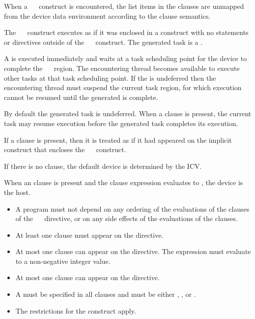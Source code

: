\descr
When a ~~ construct is encountered, the list items in the  clauses are unmapped from the device data environment according to the  clause semantics.

The ~~ construct executes as if it was enclosed in a  construct with no statements or directives outside of the ~~ construct. The generated task is a .

A  is executed immediately and waits at a task scheduling point for the device to complete the ~~ region. The encountering thread becomes available to execute other tasks at that task scheduling point. If the  is undeferred then the encountering thread must suspend the current task region, for which execution cannot be resumed until the generated  is complete.

By default the generated task is undeferred. When a  clause is present, the current task may resume execution before the generated task completes its execution.

If a  clause is present, then it is treated as if it had appeared on the implicit  construct that encloses the ~~ construct.

If there is no  clause, the default device is determined by the  ICV.

When an  clause is present and the  clause expression evaluates to , the device is the host. 
\restrictions
\begin{itemize}
\item A program must not depend on any ordering of the evaluations of the clauses of the ~~ directive, or on any side effects of the evaluations of the clauses.
\item At least one  clause must appear on the directive.
\item At most one  clause can appear on the directive. The  expression must evaluate to a non-negative integer value.
\item At most one  clause can appear on the directive.
\item A  must be specified in all  clauses and must be either , , or .
\item The restrictions for the  construct apply. 
\end{itemize}

